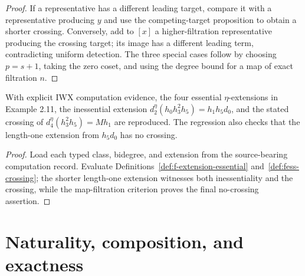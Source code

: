\begin{proof}
  If a representative has a different leading target, compare it with a
  representative producing $y$ and use the competing-target proposition to
  obtain a shorter crossing.  Conversely, add to $[x]$ a higher-filtration
  representative producing the crossing target; its image has a different
  leading term, contradicting uniform detection.  The three special cases
  follow by choosing $p=s+1$, taking the zero coset, and using the degree bound
  for a map of exact filtration $n$.
\end{proof}

\begin{proposition}
  \label{prop:eta-ess-regression}
  \notready
  With explicit IWX computation evidence, the four essential
  $\eta$-extensions in Example 2.11, the inessential extension
  $d_2^\eta(h_0h_3^2h_5)=h_1h_5d_0$, and the stated crossing of
  $d_4^\eta(h_3^2h_5)=Mh_1$ are reproduced.  The regression also checks that
  the length-one extension from $h_5d_0$ has no crossing.
\end{proposition}

\begin{proof}
  Load each typed class, bidegree, and extension from the source-bearing
  computation record.  Evaluate Definitions~\ref{def:f-extension-essential}
  and~\ref{def:fess-crossing}; the shorter length-one extension witnesses both
  inessentiality and the crossing, while the map-filtration criterion proves
  the final no-crossing assertion.
\end{proof}

\section{Naturality, composition, and exactness}

